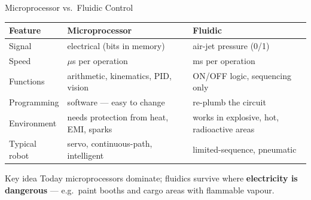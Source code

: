 \documentclass[aspectratio=169]{beamer}
\begin{document}
	\begin{frame}{Microprocessor vs.\ Fluidic Control}
		\renewcommand{\arraystretch}{1.3}
		\centering
		\small
		\begin{tabular}{@{}>{\raggedright}p{3.2cm}>{\raggedright}p{4.6cm}>{\raggedright\arraybackslash}p{4.6cm}@{}}
			\toprule
			\textbf{Feature} & \textbf{Microprocessor} & \textbf{Fluidic} \\
			\midrule
			Signal         & electrical (bits in memory)     & air-jet pressure (0/1) \\
			Speed          & $\mu$s per operation            & ms per operation \\
			Functions      & arithmetic, kinematics, PID, vision & ON/OFF logic, sequencing only \\
			Programming    & software --- easy to change     & re-plumb the circuit \\
			Environment    & needs protection from heat, EMI, sparks & works in explosive, hot, radioactive areas \\
			Typical robot  & servo, continuous-path, intelligent & limited-sequence, pneumatic \\
			\bottomrule
		\end{tabular}
		\vspace{0.3cm}
		\begin{block}{Key idea}
			\small Today microprocessors dominate; fluidics survive where \textbf{electricity is dangerous} --- e.g.\ paint booths and cargo areas with flammable vapour.
		\end{block}
	\end{frame}
\end{document}
